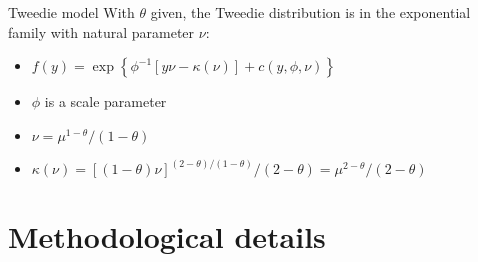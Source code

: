 \documentclass{beamer}
\begin{document}
\begin{frame}[fragile]{Tweedie model}
  With $\theta$ given, the Tweedie distribution is in the exponential family with natural parameter $\nu$:\\
  \begin{itemize}
    \item $f(y) = \exp\left\{ \phi^{-1} \left[ y \nu - \kappa(\nu)\right] + c(y,\phi,\nu) \right\}$
    \item $\phi$ is a scale parameter
    \item $\nu = \mu^{1-\theta} / \left(1-\theta\right)$
    \item $\kappa \left(\nu\right) = \left[(1-\theta)\nu\right]^{\left(2-\theta\right) / \left(1-\theta\right)} / \left(2-\theta\right) = \mu^{2-\theta} / \left(2-\theta\right)$
  \end{itemize}
\end{frame}


\section{Methodological details}
\subsection{}
\end{document}
